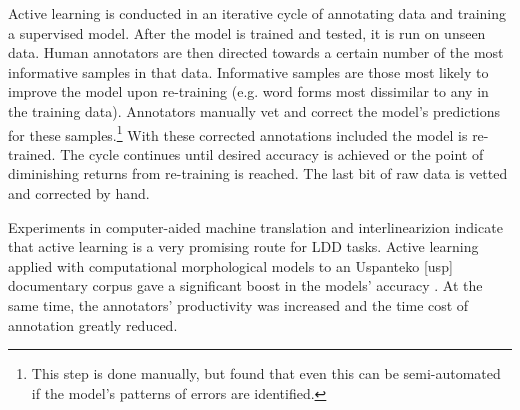 \documentclass[12pt]{article}
\begin{document}
Active learning is conducted in an iterative cycle of annotating data and training a supervised model. After the model is trained and tested, it is run on unseen data. Human annotators are then directed towards a certain number of the most informative samples in that data. Informative samples are those most likely to improve the model upon re-training (e.g. word forms most dissimilar to any in the training data). Annotators manually vet and correct the model's predictions for these samples.\footnote{This step is done manually, but  found that even this can be semi-automated if the model's patterns of errors are identified.} With these corrected annotations included the model is re-trained. The cycle continues until desired accuracy is achieved or the point of diminishing returns from re-training is reached. The last bit of raw data is vetted and corrected by hand.

Experiments in computer-aided machine translation \cite{kothur_document-level_2018} and interlinearizion \cite{palmer_semi-automated_2009,palmer_evaluating_2009,palmer_computational_2010} indicate that active learning is a very promising route for LDD tasks. Active learning applied with computational morphological models to an Uspanteko [usp] documentary corpus gave a significant boost in the models' accuracy \cite{palmer_semi-automated_2009}. At the same time, the annotators' productivity was increased and the time cost of annotation greatly reduced.
\end{document}
